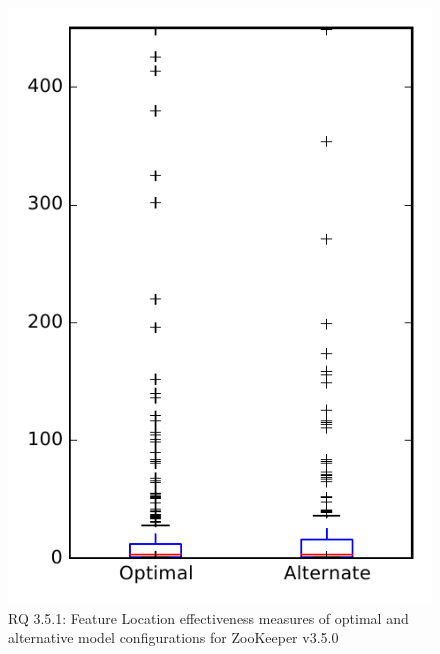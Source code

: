 
\begin{figure}
\centering
\includegraphics[height=0.4\textheight]{figures/combo/flt_rq1_zookeeper}
\caption{RQ 3.5.1: Feature Location effectiveness measures of optimal and alternative model configurations for ZooKeeper v3.5.0}
\label{fig:combo:flt:rq1:zookeeper}
\end{figure}
